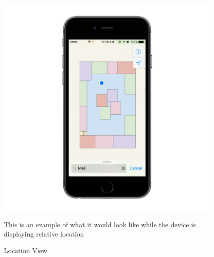 \begin{figure}
\includegraphics[width=1\textwidth]{images/con2.png}
\caption{Location View}
This is an example of what it would look like while the device is displaying relative location
\end{figure}
